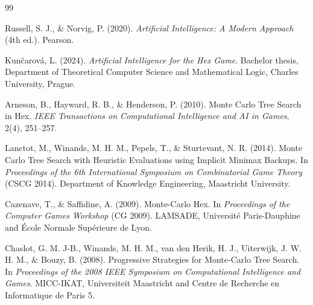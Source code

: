 \documentclass[12pt]{article}
\begin{document}
\begin{thebibliography}{99}

Russell, S. J., \& Norvig, P. (2020). \textit{Artificial Intelligence: A Modern Approach} (4th ed.). Pearson.

Kunčarová, L. (2024). \textit{Artificial Intelligence for the Hex Game}. Bachelor thesis, Department of Theoretical Computer Science and Mathematical Logic, Charles University, Prague.

Arneson, B., Hayward, R. B., \& Henderson, P. (2010). Monte Carlo Tree Search in Hex. \textit{IEEE Transactions on Computational Intelligence and AI in Games}, 2(4), 251--257.

Lanctot, M., Winands, M. H. M., Pepels, T., \& Sturtevant, N. R. (2014). Monte Carlo Tree Search with Heuristic Evaluations using Implicit Minimax Backups. In \textit{Proceedings of the 6th International Symposium on Combinatorial Game Theory} (CSCG 2014). Department of Knowledge Engineering, Maastricht University.

Cazenave, T., \& Saffidine, A. (2009). Monte-Carlo Hex. In \textit{Proceedings of the Computer Games Workshop} (CG 2009). LAMSADE, Université Paris-Dauphine and École Normale Supérieure de Lyon.

Chaslot, G. M. J-B., Winands, M. H. M., van den Herik, H. J., Uiterwijk, J. W. H. M., \& Bouzy, B. (2008). Progressive Strategies for Monte-Carlo Tree Search. In \textit{Proceedings of the 2008 IEEE Symposium on Computational Intelligence and Games}. MICC-IKAT, Universiteit Maastricht and Centre de Recherche en Informatique de Paris 5.


\end{thebibliography}
\end{document}
